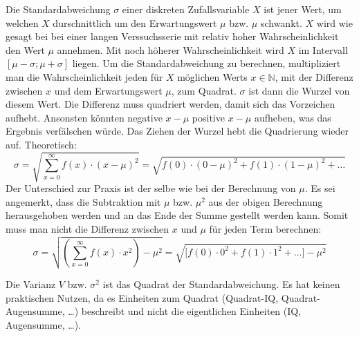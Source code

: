 Die Standardabweichung $\sigma$ einer diskreten Zufallsvariable $X$ ist jener Wert, um welchen $X$ durschnittlich um den Erwartungswert $\mu$ bzw. $\mu$ schwankt. $X$ wird wie gesagt bei bei einer langen Verssuchsserie mit relativ hoher Wahrscheinlichkeit den Wert $\mu$ annehmen. Mit noch h\"{o}herer Wahrscheinlichkeit wird $X$ im Intervall $[\mu - \sigma ; \mu + \sigma]$ liegen. Um die Standardabweichung zu berechnen, multipliziert man die Wahrscheinlichkeit jeden f\"{u}r $X$ m\"{o}glichen Werts $x \in \mathbb{N}$, mit der Differenz zwischen $x$ und dem Erwartungswert $\mu$, zum Quadrat. $\sigma$ ist dann die Wurzel von diesem Wert. Die Differenz muss quadriert werden, damit sich das Vorzeichen aufhebt. Ansonsten k\"{o}nnten negative $x - \mu$ positive $x - \mu$ aufheben, was das Ergebnis verf\"{a}lschen w\"{u}rde. Das Ziehen der Wurzel hebt die Quadrierung wieder auf. Theoretisch: $$\sigma = \sqrt{\sum_{x=0}^{\infty} f(x) \cdot (x - \mu)^2} = \sqrt{f(0) \cdot (0 - \mu)^2 + f(1) \cdot (1 - \mu)^2 + \dots}$$ Der Unterschied zur Praxis ist der selbe wie bei der Berechnung von $\mu$. Es sei angemerkt, dass die Subtraktion mit $\mu$ bzw. $\mu^2$ aus der obigen Berechnung herausgehoben werden und an das Ende der Summe gestellt werden kann. Somit muss man nicht die Differenz zwischen $x$ und $\mu$ f\"{u}r jeden Term berechnen: $$\sigma = \sqrt{\left( \sum_{x=0}^{\infty} f(x) \cdot x^2\right) - \mu^2} = \sqrt{\big[ f(0) \cdot 0^2 + f(1) \cdot 1^2 + \dots \big] - \mu^2}$$

Die Varianz $V$ bzw. $\sigma^2$ ist das Quadrat der Standardabweichung. Es hat keinen praktischen Nutzen, da es Einheiten zum Quadrat (Quadrat-IQ, Quadrat-Augensumme, \dots) beschreibt und nicht die eigentlichen Einheiten (IQ, Augensumme, \dots).



